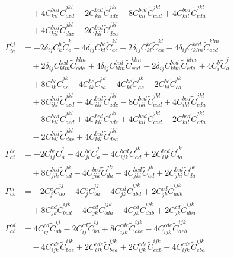 \begin{align}
&\quad {}+ 4 C^{bcd}_{kil} \widetilde{C}^{jkl}_{acd} - 2 C^{bcd}_{kil} \widetilde{C}^{jkl}_{adc} - 8 C^{bcd}_{kil} \widetilde{C}^{jkl}_{cad} + 4 C^{bcd}_{kil} \widetilde{C}^{jkl}_{cda} \\
&\quad {}+ 4 C^{bcd}_{kil} \widetilde{C}^{jkl}_{dac} - 2 C^{bcd}_{kil} \widetilde{C}^{jkl}_{dca} \\
\Gamma^{bj}_{ia} &= -2 \delta_{ij} C^{b}_{k} \widetilde{C}^{k}_{a} - 4 \delta_{ij} C^{bc}_{kl} \widetilde{C}^{kl}_{ac} + 2 \delta_{ij} C^{bc}_{kl} \widetilde{C}^{kl}_{ca} - 4 \delta_{ij} C^{bcd}_{klm} \widetilde{C}^{klm}_{acd} \\
&\quad {}+ 2 \delta_{ij} C^{bcd}_{klm} \widetilde{C}^{klm}_{adc} + 4 \delta_{ij} C^{bcd}_{klm} \widetilde{C}^{klm}_{cad} - 2 \delta_{ij} C^{bcd}_{klm} \widetilde{C}^{klm}_{cda} + 4 C^{b}_{i} \widetilde{C}^{j}_{a} \\
&\quad {}+ 8 C^{bc}_{ik} \widetilde{C}^{jk}_{ac} - 4 C^{bc}_{ik} \widetilde{C}^{jk}_{ca} - 4 C^{bc}_{ki} \widetilde{C}^{jk}_{ac} + 2 C^{bc}_{ki} \widetilde{C}^{jk}_{ca} \\
&\quad {}+ 8 C^{bcd}_{ikl} \widetilde{C}^{jkl}_{acd} - 4 C^{bcd}_{ikl} \widetilde{C}^{jkl}_{adc} - 8 C^{bcd}_{ikl} \widetilde{C}^{jkl}_{cad} + 4 C^{bcd}_{ikl} \widetilde{C}^{jkl}_{cda} \\
&\quad -8 C^{bcd}_{kil} \widetilde{C}^{jkl}_{acd} + 4 C^{bcd}_{kil} \widetilde{C}^{jkl}_{adc} + 4 C^{bcd}_{kil} \widetilde{C}^{jkl}_{cad} - 2 C^{bcd}_{kil} \widetilde{C}^{jkl}_{cda} \\
&\quad -2 C^{bcd}_{kil} \widetilde{C}^{jkl}_{dac} + 4 C^{bcd}_{kil} \widetilde{C}^{jkl}_{dca} \\
\Gamma^{bc}_{ai} &= -2 C^{bc}_{ij} \widetilde{C}^{j}_{a} + 4 C^{bc}_{ji} \widetilde{C}^{j}_{a} - 4 C^{bcd}_{ijk} \widetilde{C}^{jk}_{ad} + 2 C^{bcd}_{ijk} \widetilde{C}^{jk}_{da} \\
&\quad {}+ 8 C^{bcd}_{jik} \widetilde{C}^{jk}_{ad} - 4 C^{bcd}_{jik} \widetilde{C}^{jk}_{da} - 4 C^{bcd}_{jki} \widetilde{C}^{jk}_{ad} + 2 C^{bcd}_{jki} \widetilde{C}^{jk}_{da} \\
\Gamma^{ci}_{ab} &= -2 C^{c}_{j} \widetilde{C}^{ij}_{ab} + 4 C^{c}_{j} \widetilde{C}^{ij}_{ba} - 4 C^{cd}_{jk} \widetilde{C}^{ijk}_{abd} + 2 C^{cd}_{jk} \widetilde{C}^{ijk}_{adb} \\
&\quad {}+ 8 C^{cd}_{jk} \widetilde{C}^{ijk}_{bad} - 4 C^{cd}_{jk} \widetilde{C}^{ijk}_{bda} - 4 C^{cd}_{jk} \widetilde{C}^{ijk}_{dab} + 2 C^{cd}_{jk} \widetilde{C}^{ijk}_{dba} \\
\Gamma^{cd}_{ab} &= 4 C^{cd}_{ij} \widetilde{C}^{ij}_{ab} - 2 C^{cd}_{ij} \widetilde{C}^{ij}_{ba} + 8 C^{cde}_{ijk} \widetilde{C}^{ijk}_{abe} - 4 C^{cde}_{ijk} \widetilde{C}^{ijk}_{aeb} \\
&\quad -4 C^{cde}_{ijk} \widetilde{C}^{ijk}_{bae} + 2 C^{cde}_{ijk} \widetilde{C}^{ijk}_{bea} + 2 C^{cde}_{ijk} \widetilde{C}^{ijk}_{eab} - 4 C^{cde}_{ijk} \widetilde{C}^{ijk}_{eba}
\end{align}
